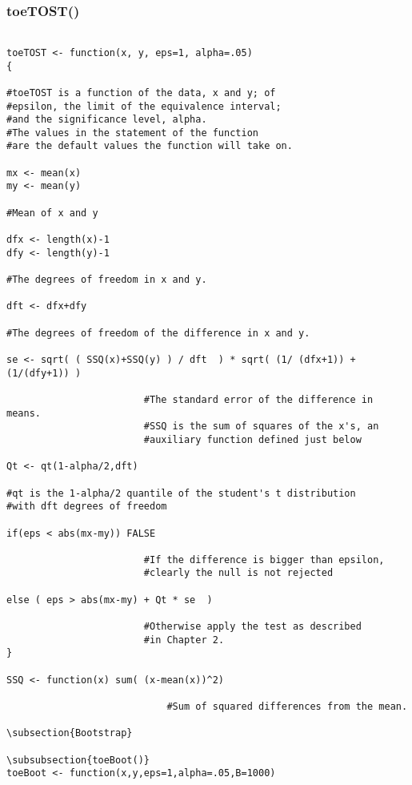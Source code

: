 \subsubsection{toeTOST()}
\label{sect:artificial}
\begin{verbatim}

toeTOST <- function(x, y, eps=1, alpha=.05)
{

#toeTOST is a function of the data, x and y; of 
#epsilon, the limit of the equivalence interval; 
#and the significance level, alpha.
#The values in the statement of the function 
#are the default values the function will take on.

mx <- mean(x) 				
my <- mean(y)			
	
#Mean of x and y

dfx <- length(x)-1			
dfy <- length(y)-1			

#The degrees of freedom in x and y.

dft <- dfx+dfy				

#The degrees of freedom of the difference in x and y.

se <- sqrt( ( SSQ(x)+SSQ(y) ) / dft  ) * sqrt( (1/ (dfx+1)) + (1/(dfy+1)) )
						
						#The standard error of the difference in means. 
						#SSQ is the sum of squares of the x's, an 
						#auxiliary function defined just below
						
Qt <- qt(1-alpha/2,dft)			

#qt is the 1-alpha/2 quantile of the student's t distribution 
#with dft degrees of freedom

if(eps < abs(mx-my)) FALSE	
						
						#If the difference is bigger than epsilon, 
						#clearly the null is not rejected
						
else ( eps > abs(mx-my) + Qt * se  )
						
						#Otherwise apply the test as described 
						#in Chapter 2.
}

SSQ <- function(x) sum( (x-mean(x))^2)
							
							#Sum of squared differences from the mean. 
							
\subsection{Bootstrap}

\subsubsection{toeBoot()}							
toeBoot <- function(x,y,eps=1,alpha=.05,B=1000)


\end{verbatim}
